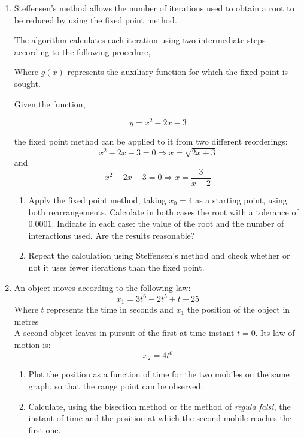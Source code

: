 \begin{paracol}{2}
\begin{enumerate}
\item Steffensen's method allows the number of iterations used to obtain a root to be reduced by using the fixed point method.

The algorithm calculates each iteration using two intermediate steps according to the following procedure,


Where $g(x)$ represents the auxiliary function for which the fixed point is sought.


Given the function,

\begin{equation*}
y= x^2-2x-3
\end{equation*} 

the fixed point method can be applied to it from two different reorderings:
\begin{equation}
x^2-2x-3=0 \Rightarrow x=\sqrt{2x+3}
\end{equation}
and
\begin{equation}
x^2-2x-3=0 \Rightarrow x=\frac{3}{x-2}
\end{equation}
\begin{enumerate}
\item Apply the fixed point method, taking $x_0=4$ as a starting point, using both rearrangements. Calculate in both cases the root with a tolerance of $0.0001$. Indicate in each case: the value of the root and the number of interactions used. Are the results reasonable?

\item Repeat the calculation using Steffensen's method and check whether or not it uses fewer iterations than the fixed point.
\end{enumerate}

\item An object moves according to the following law:
\begin{equation}
x_1 = 3t^6 - 2t^5 + t + 25
\end{equation}
Where $t$ represents the time in seconds and $x_1$ the position of the object in metres \\
 A second object leaves in pursuit of the first at time instant $t=0$. Its law of motion is:
\begin{equation}
x_2 = 4t^6
\end{equation}
\begin{enumerate}
\item Plot the position as a function of time for the two mobiles on the same graph, so that the range point can be observed.  
\item Calculate, using the bisection method or the method of \emph{regula falsi}, the instant of time and the position at which the second mobile reaches the first one.
\end{enumerate}


\end{enumerate}
\end{paracol}
